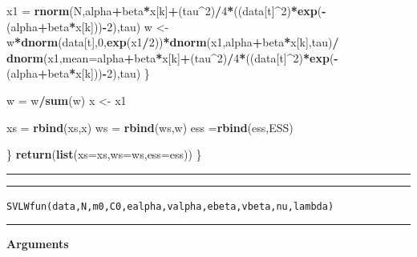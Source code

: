 \documentclass[
]{book}
\newenvironment{Shaded}{\begin{snugshade}}{\end{snugshade}}
\newcommand{\DataTypeTok}[1]{\textcolor[rgb]{0.13,0.29,0.53}{#1}}
\newcommand{\DecValTok}[1]{\textcolor[rgb]{0.00,0.00,0.81}{#1}}
\newcommand{\KeywordTok}[1]{\textcolor[rgb]{0.13,0.29,0.53}{\textbf{#1}}}
\newcommand{\NormalTok}[1]{#1}
\newcommand{\OperatorTok}[1]{\textcolor[rgb]{0.81,0.36,0.00}{\textbf{#1}}}
\newcommand{\StringTok}[1]{\textcolor[rgb]{0.31,0.60,0.02}{#1}}
\theoremstyle{break}
\theoremstyle{nonumberplain}
\begin{document}
\begin{Shaded}
\begin{Highlighting}[]
\NormalTok{      x1   =}\StringTok{ }\KeywordTok{rnorm}\NormalTok{(N,alpha}\OperatorTok{+}\NormalTok{beta}\OperatorTok{*}\NormalTok{x[k]}\OperatorTok{+}\NormalTok{(tau}\OperatorTok{^}\DecValTok{2}\NormalTok{)}\OperatorTok{/}\DecValTok{4}\OperatorTok{*}\NormalTok{((data[t]}\OperatorTok{^}\DecValTok{2}\NormalTok{)}\OperatorTok{*}\KeywordTok{exp}\NormalTok{(}\OperatorTok{-}\NormalTok{(alpha}\OperatorTok{+}\NormalTok{beta}\OperatorTok{*}\NormalTok{x[k]))}\OperatorTok{-}\DecValTok{2}\NormalTok{),tau)}
\NormalTok{      w   <-}\StringTok{  }\NormalTok{w}\OperatorTok{*}\KeywordTok{dnorm}\NormalTok{(data[t],}\DecValTok{0}\NormalTok{,}\KeywordTok{exp}\NormalTok{(x1}\OperatorTok{/}\DecValTok{2}\NormalTok{))}\OperatorTok{*}\KeywordTok{dnorm}\NormalTok{(x1,alpha}\OperatorTok{+}\NormalTok{beta}\OperatorTok{*}\NormalTok{x[k],tau)}\OperatorTok{/}
\StringTok{        }\KeywordTok{dnorm}\NormalTok{(x1,}\DataTypeTok{mean=}\NormalTok{alpha}\OperatorTok{+}\NormalTok{beta}\OperatorTok{*}\NormalTok{x[k]}\OperatorTok{+}\NormalTok{(tau}\OperatorTok{^}\DecValTok{2}\NormalTok{)}\OperatorTok{/}\DecValTok{4}\OperatorTok{*}\NormalTok{((data[t]}\OperatorTok{^}\DecValTok{2}\NormalTok{)}\OperatorTok{*}\KeywordTok{exp}\NormalTok{(}\OperatorTok{-}\NormalTok{(alpha}\OperatorTok{+}\NormalTok{beta}\OperatorTok{*}\NormalTok{x[k]))}\OperatorTok{-}\DecValTok{2}\NormalTok{),tau)}
\NormalTok{    \}}
    
\NormalTok{    w   =}\StringTok{ }\NormalTok{w}\OperatorTok{/}\KeywordTok{sum}\NormalTok{(w)}
\NormalTok{    x <-}\StringTok{ }\NormalTok{x1}
    
    
\NormalTok{    xs =}\StringTok{ }\KeywordTok{rbind}\NormalTok{(xs,x)}
\NormalTok{    ws =}\StringTok{ }\KeywordTok{rbind}\NormalTok{(ws,w)}
\NormalTok{    ess =}\KeywordTok{rbind}\NormalTok{(ess,ESS)}
    
\NormalTok{  \}}
  \KeywordTok{return}\NormalTok{(}\KeywordTok{list}\NormalTok{(}\DataTypeTok{xs=}\NormalTok{xs,}\DataTypeTok{ws=}\NormalTok{ws,}\DataTypeTok{ess=}\NormalTok{ess))}
\NormalTok{\}}
\end{Highlighting}
\end{Shaded}

\hrule
\hrule

\texttt{SVLWfun(data,N,m0,C0,ealpha,valpha,ebeta,vbeta,nu,lambda)}\\

\hrule

\textbf{Arguments}
\end{document}
